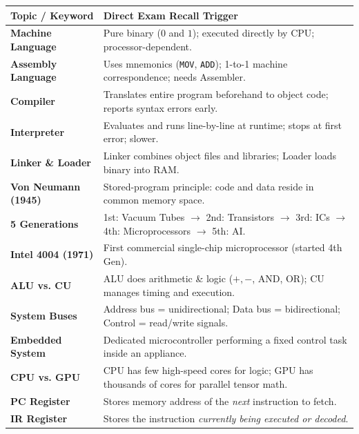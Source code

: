 \documentclass[a4paper,11pt]{article}
\begin{document}
\begin{tcolorbox}[enhanced, colback=NoteYellow, colframe=DeepNavy, boxrule=1.2pt, arc=3mm, title={\large\bfseries The Night-Before Exam Memory Matrix}, fonttitle=\sffamily\bfseries\color{white}, colbacktitle=DeepNavy]
\small\sffamily
\renewcommand{\arraystretch}{1.25}
\begin{tabularx}{\textwidth}{@{}l X@{}}
\textbf{Topic / Keyword} & \textbf{Direct Exam Recall Trigger} \\
\midrule
\textbf{Machine Language} & Pure binary ($0$ and $1$); executed directly by CPU; processor-dependent. \\
\textbf{Assembly Language} & Uses mnemonics (\texttt{MOV}, \texttt{ADD}); 1-to-1 machine correspondence; needs Assembler. \\
\textbf{Compiler} & Translates entire program beforehand to object code; reports syntax errors early. \\
\textbf{Interpreter} & Evaluates and runs line-by-line at runtime; stops at first error; slower. \\
\textbf{Linker \& Loader} & Linker combines object files and libraries; Loader loads binary into RAM. \\
\midrule
\textbf{Von Neumann (1945)} & Stored-program principle: code and data reside in common memory space. \\
\textbf{5 Generations} & 1st: Vacuum Tubes $\rightarrow$ 2nd: Transistors $\rightarrow$ 3rd: ICs $\rightarrow$ 4th: Microprocessors $\rightarrow$ 5th: AI. \\
\textbf{Intel 4004 (1971)} & First commercial single-chip microprocessor (started 4th Gen). \\
\textbf{ALU vs. CU} & ALU does arithmetic \& logic ($+, -$, AND, OR); CU manages timing and execution. \\
\textbf{System Buses} & Address bus = unidirectional; Data bus = bidirectional; Control = read/write signals. \\
\textbf{Embedded System} & Dedicated microcontroller performing a fixed control task inside an appliance. \\
\midrule
\textbf{CPU vs. GPU} & CPU has few high-speed cores for logic; GPU has thousands of cores for parallel tensor math. \\
\textbf{PC Register} & Stores memory address of the \textit{next} instruction to fetch. \\
\textbf{IR Register} & Stores the instruction \textit{currently being executed or decoded}. \\

\end{tabularx}
\end{tcolorbox}
\end{document}
